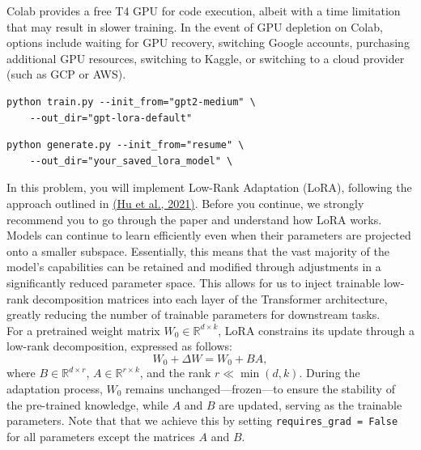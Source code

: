 \documentclass[11pt,addpoints,answers]{exam}
\begin{document}
\begin{questions}

Colab provides a free T4 GPU for code execution, albeit with a time limitation that may result in slower training. In the event of GPU depletion on Colab, options include waiting for GPU recovery, switching Google accounts, purchasing additional GPU resources, switching to Kaggle, or switching to a cloud provider (such as GCP or AWS).

\begin{lstlisting}
python train.py --init_from="gpt2-medium" \
    --out_dir="gpt-lora-default"
\end{lstlisting}

\begin{lstlisting}
python generate.py --init_from="resume" \
    --out_dir="your_saved_lora_model" \
\end{lstlisting}


\clearpage
{}


In this problem, you will implement Low-Rank Adaptation (LoRA), following the approach outlined in \href{https://arxiv.org/pdf/2106.09685.pdf}{(Hu et al., 2021)}. Before you continue, we strongly recommend you to go through the paper and understand how LoRA works. \\
Models can continue to learn efficiently even when their parameters are projected onto a smaller subspace. Essentially, this means that the vast majority of the model's capabilities can be retained and modified through adjustments in a significantly reduced parameter space. This allows for us to inject trainable low-rank decomposition matrices into each layer of the Transformer architecture, greatly reducing the number of trainable parameters for downstream tasks.\\
For a pretrained weight matrix \(W_0 \in \mathbb{R}^{d \times k}\), LoRA constrains its update through a low-rank decomposition, expressed as follows:
\[W_0 + \Delta W = W_0 + BA,\]
where \(B \in \mathbb{R}^{d \times r}\), \(A \in \mathbb{R}^{r \times k}\), and the rank  \(r \ll \min(d,k)\). During the adaptation process, \(W_0\) remains unchanged—frozen—to ensure the stability of the pre-trained knowledge, while \(A\) and \(B\) are updated, serving as the trainable parameters. Note that that we achieve this by setting \lstinline{requires_grad = False} for all parameters except the matrices \(A\) and \(B\).


\end{questions}
\end{document}
